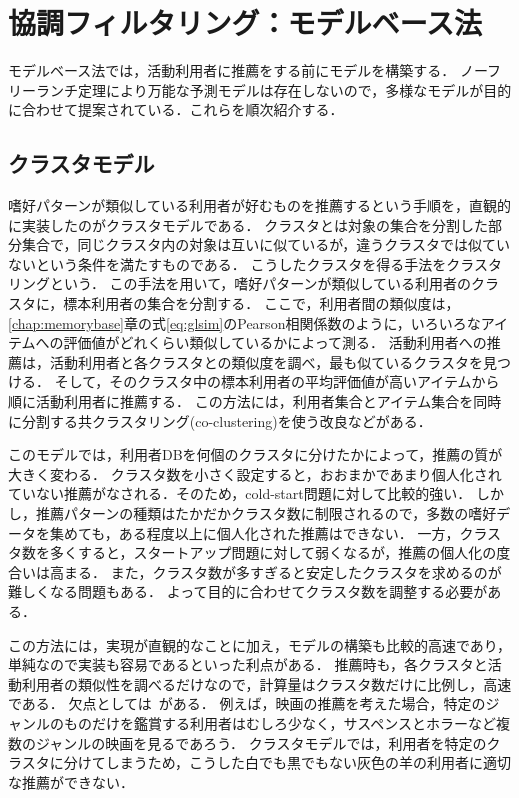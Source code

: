 \chapter{協調フィルタリング：モデルベース法}
\label{chap:modelbase}

モデルベース法では，活動利用者に推薦をする前にモデルを構築する．
ノーフリーランチ定理により万能な予測モデルは存在しないので，多様なモデルが目的に合わせて提案されている．これらを順次紹介する．

\section{クラスタモデル}
\label{sec:clustermodel}

嗜好パターンが類似している利用者が好むものを推薦するという手順を，直観的に実装したのがクラスタモデルである\cite{uai:98:01,epublist:039}．
クラスタとは対象の集合を分割した部分集合で，同じクラスタ内の対象は互いに似ているが，違うクラスタでは似ていないという条件を満たすものである．
こうしたクラスタを得る手法をクラスタリングという\cite{jpublist:034,jb:038:00,jb:020:00}．
この手法を用いて，嗜好パターンが類似している利用者のクラスタに，標本利用者の集合を分割する．
ここで，利用者間の類似度は，\ref{chap:memorybase}章の式\eqref{eq:glsim}のPearson相関係数のように，いろいろなアイテムへの評価値がどれくらい類似しているかによって測る．
活動利用者への推薦は，活動利用者と各クラスタとの類似度を調べ，最も似ているクラスタを見つける．
そして，そのクラスタ中の標本利用者の平均評価値が高いアイテムから順に活動利用者に推薦する．
この方法には，利用者集合とアイテム集合を同時に分割する共クラスタリング(co-clustering)を使う改良\cite{icdm:05:05}などがある．

このモデルでは，利用者DBを何個のクラスタに分けたかによって，推薦の質が大きく変わる．
クラスタ数を小さく設定すると，おおまかであまり個人化されていない推薦がなされる．そのため，cold-start問題に対して比較的強い．
しかし，推薦パターンの種類はたかだかクラスタ数に制限されるので，多数の嗜好データを集めても，ある程度以上に個人化された推薦はできない．
一方，クラスタ数を多くすると，スタートアップ問題に対して弱くなるが，推薦の個人化の度合いは高まる．
また，クラスタ数が多すぎると安定したクラスタを求めるのが難しくなる問題もある．
よって目的に合わせてクラスタ数を調整する必要がある．

この方法には，実現が直観的なことに加え，モデルの構築も比較的高速であり，単純なので実装も容易であるといった利点がある．
推薦時も，各クラスタと活動利用者の類似性を調べるだけなので，計算量はクラスタ数だけに比例し，高速である．
欠点としては~\cite{ej:048}がある．
例えば，映画の推薦を考えた場合，特定のジャンルのものだけを鑑賞する利用者はむしろ少なく，サスペンスとホラーなど複数のジャンルの映画を見るであろう．
クラスタモデルでは，利用者を特定のクラスタに分けてしまうため，こうした白でも黒でもない灰色の羊の利用者に適切な推薦ができない．

